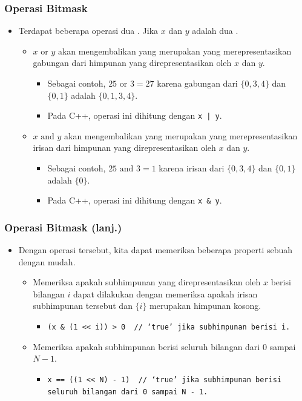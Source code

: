 \begin{frame}
\frametitle{Operasi Bitmask}
\begin{itemize}
  \item Terdapat beberapa operasi dua \fbitmask. Jika $x$ dan $y$ adalah dua \fbitmask.
  \begin{itemize}
    \item $x \text{ or } y$ akan mengembalikan \fbitmask yang merupakan \fbitmask yang merepresentasikan gabungan dari himpunan yang direpresentasikan oleh $x$ dan $y$.
    \begin{itemize}
      \item Sebagai contoh, $25 \text{ or } 3 = 27$ karena gabungan dari $\{0, 3, 4\}$ dan $\{0, 1\}$ adalah $\{0, 1, 3, 4\}$.
      \item Pada C++, operasi ini dihitung dengan \lstinline{x | y}.
    \end{itemize}
    \item $x \text{ and } y$ akan mengembalikan \fbitmask yang merupakan \fbitmask yang merepresentasikan irisan dari himpunan yang direpresentasikan oleh $x$ dan $y$.
    \begin{itemize}
      \item Sebagai contoh, $25 \text{ and } 3 = 1$ karena irisan dari $\{0, 3, 4\}$ dan $\{0, 1\}$ adalah $\{0\}$.
      \item Pada C++, operasi ini dihitung dengan \lstinline{x & y}.
    \end{itemize}
  \end{itemize}
\end{itemize}
\end{frame}

\begin{frame}
\frametitle{Operasi Bitmask (lanj.)}
\begin{itemize}
  \item Dengan operasi tersebut, kita dapat memeriksa beberapa properti sebuah \fbitmask dengan mudah.
  \begin{itemize}
    \item Memeriksa apakah subhimpunan yang direpresentasikan oleh \fbitmask $x$ berisi bilangan $i$ dapat dilakukan dengan memeriksa apakah irisan subhimpunan tersebut dan $\{i\}$ merupakan himpunan kosong.
    \begin{itemize}
      \item \lstinline{(x & (1 << i)) > 0  // ‘true’ jika subhimpunan berisi i.}
    \end{itemize}
    \item Memeriksa apakah subhimpunan berisi seluruh bilangan dari $0$ sampai $N - 1$.
    \begin{itemize}
      \item \lstinline{x == ((1 << N) - 1)  // ‘true’ jika subhimpunan berisi seluruh bilangan dari 0 sampai N - 1.}
    \end{itemize}
  \end{itemize}
\end{itemize}
\end{frame}

